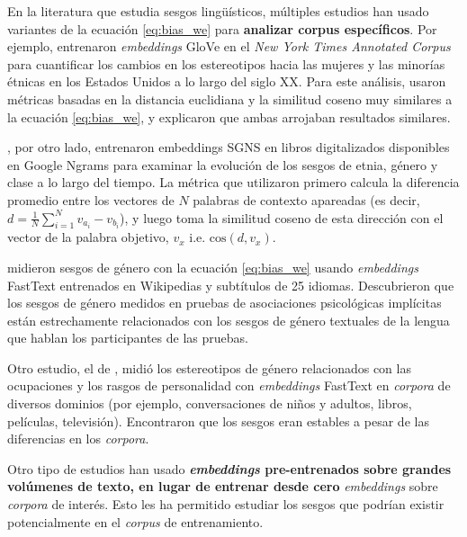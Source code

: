 En la literatura que estudia sesgos lingüísticos, múltiples estudios han usado variantes de la ecuación \ref{eq:bias_we} para \textbf{analizar corpus específicos}. Por ejemplo, \citet{garg2018word} entrenaron \emph{embeddings} GloVe en el \emph{New York Times Annotated Corpus} para cuantificar los cambios en los estereotipos hacia las mujeres y las minorías étnicas en los Estados Unidos a lo largo del siglo XX. Para este análisis, usaron métricas basadas en la distancia euclidiana y la similitud coseno muy similares a la ecuación \ref{eq:bias_we}, y explicaron que ambas arrojaban resultados similares.

\citet{kozlowski2019geometry}, por otro lado, entrenaron embeddings SGNS en libros digitalizados disponibles en Google Ngrams para examinar la evolución de los sesgos de etnia, género y clase a lo largo del tiempo. La métrica que utilizaron primero calcula la diferencia promedio entre los vectores de $N$ palabras de contexto apareadas (es decir, $d = \frac{1}{N} \sum_{i=1}^N v_{a_i}-v_{b_i}$), y luego toma la similitud coseno de esta dirección con el vector de la palabra objetivo, $v_x$ i.e. $\text{cos}(d,v_x)$.



\citet{lewis2020gender} midieron sesgos de género con la ecuación \ref{eq:bias_we} usando \emph{embeddings} FastText entrenados en Wikipedias y subtítulos de 25 idiomas. Descubrieron que los sesgos de género medidos en pruebas de asociaciones psicológicas implícitas están estrechamente relacionados con los sesgos de género textuales de la lengua que hablan los participantes de las pruebas.

Otro estudio, el de \citet{charlesworth2021gender}, midió los estereotipos de género relacionados con las ocupaciones y los rasgos de personalidad con \emph{embeddings} FastText en \emph{corpora} de diversos dominios (por ejemplo, conversaciones de niños y adultos, libros, películas, televisión). Encontraron que los sesgos eran estables a pesar de las diferencias en los \emph{corpora}.

Otro tipo de estudios han usado \textbf{\emph{embeddings} pre-entrenados sobre grandes volúmenes de texto, en lugar de entrenar desde cero} \emph{embeddings} sobre \emph{corpora} de interés. Esto les ha permitido estudiar los sesgos que podrían existir potencialmente en el \emph{corpus} de entrenamiento. 

